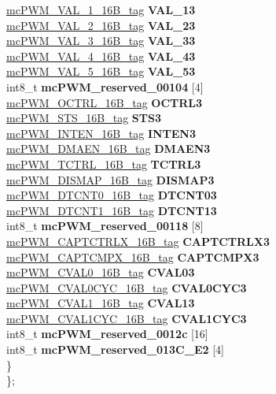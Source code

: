 \begin{DoxyCompactItemize}
\begin{tabbing}
\>\>\mbox{\hyperlink{unionmcPWM__VAL__1__16B__tag}{mcPWM\_VAL\_1\_16B\_tag}} {\bfseries VAL\_13}\\
\>\>\mbox{\hyperlink{unionmcPWM__VAL__2__16B__tag}{mcPWM\_VAL\_2\_16B\_tag}} {\bfseries VAL\_23}\\
\>\>\mbox{\hyperlink{unionmcPWM__VAL__3__16B__tag}{mcPWM\_VAL\_3\_16B\_tag}} {\bfseries VAL\_33}\\
\>\>\mbox{\hyperlink{unionmcPWM__VAL__4__16B__tag}{mcPWM\_VAL\_4\_16B\_tag}} {\bfseries VAL\_43}\\
\>\>\mbox{\hyperlink{unionmcPWM__VAL__5__16B__tag}{mcPWM\_VAL\_5\_16B\_tag}} {\bfseries VAL\_53}\\
\>\>int8\_t {\bfseries mcPWM\_reserved\_00104} \mbox{[}4\mbox{]}\\
\>\>\mbox{\hyperlink{unionmcPWM__OCTRL__16B__tag}{mcPWM\_OCTRL\_16B\_tag}} {\bfseries OCTRL3}\\
\>\>\mbox{\hyperlink{unionmcPWM__STS__16B__tag}{mcPWM\_STS\_16B\_tag}} {\bfseries STS3}\\
\>\>\mbox{\hyperlink{unionmcPWM__INTEN__16B__tag}{mcPWM\_INTEN\_16B\_tag}} {\bfseries INTEN3}\\
\>\>\mbox{\hyperlink{unionmcPWM__DMAEN__16B__tag}{mcPWM\_DMAEN\_16B\_tag}} {\bfseries DMAEN3}\\
\>\>\mbox{\hyperlink{unionmcPWM__TCTRL__16B__tag}{mcPWM\_TCTRL\_16B\_tag}} {\bfseries TCTRL3}\\
\>\>\mbox{\hyperlink{unionmcPWM__DISMAP__16B__tag}{mcPWM\_DISMAP\_16B\_tag}} {\bfseries DISMAP3}\\
\>\>\mbox{\hyperlink{unionmcPWM__DTCNT0__16B__tag}{mcPWM\_DTCNT0\_16B\_tag}} {\bfseries DTCNT03}\\
\>\>\mbox{\hyperlink{unionmcPWM__DTCNT1__16B__tag}{mcPWM\_DTCNT1\_16B\_tag}} {\bfseries DTCNT13}\\
\>\>int8\_t {\bfseries mcPWM\_reserved\_00118} \mbox{[}8\mbox{]}\\
\>\>\mbox{\hyperlink{unionmcPWM__CAPTCTRLX__16B__tag}{mcPWM\_CAPTCTRLX\_16B\_tag}} {\bfseries CAPTCTRLX3}\\
\>\>\mbox{\hyperlink{unionmcPWM__CAPTCMPX__16B__tag}{mcPWM\_CAPTCMPX\_16B\_tag}} {\bfseries CAPTCMPX3}\\
\>\>\mbox{\hyperlink{unionmcPWM__CVAL0__16B__tag}{mcPWM\_CVAL0\_16B\_tag}} {\bfseries CVAL03}\\
\>\>\mbox{\hyperlink{unionmcPWM__CVAL0CYC__16B__tag}{mcPWM\_CVAL0CYC\_16B\_tag}} {\bfseries CVAL0CYC3}\\
\>\>\mbox{\hyperlink{unionmcPWM__CVAL1__16B__tag}{mcPWM\_CVAL1\_16B\_tag}} {\bfseries CVAL13}\\
\>\>\mbox{\hyperlink{unionmcPWM__CVAL1CYC__16B__tag}{mcPWM\_CVAL1CYC\_16B\_tag}} {\bfseries CVAL1CYC3}\\
\>\>int8\_t {\bfseries mcPWM\_reserved\_0012c} \mbox{[}16\mbox{]}\\
\>\>int8\_t {\bfseries mcPWM\_reserved\_013C\_E2} \mbox{[}4\mbox{]}\\
\>\} \\
\}; \\


\end{tabbing}
\end{DoxyCompactItemize}

